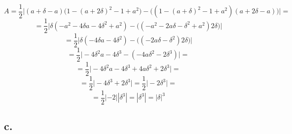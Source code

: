 \documentclass{article}
\begin{document}
\begin{equation*}
    A = \frac{1}{2}\Big|(a + \delta - a)\Big(1 - (a + 2\delta)^{2} - 1 + a^{2}\Big) - \Big((1 - (a + \delta)^{2} - 1 + a^{2})(a + 2\delta - a)\Big)\Big| =
\end{equation*}
\begin{equation*}
    = \frac{1}{2}\Big|\delta(-a^{2} - 4\delta a - 4\delta^{2} + a^{2}) - \Big((-a^{2} - 2a\delta - \delta^{2} + a^{2})2\delta\Big)\Big|
\end{equation*}
\begin{equation*}
    = \frac{1}{2}\Big|\delta(-4\delta a - 4\delta^{2}) - \Big((- 2a\delta - \delta^{2})2\delta\Big)\Big|
\end{equation*}
\begin{equation*}
    = \frac{1}{2}\Big|-4\delta^{2}a - 4\delta^{3} - (-4a\delta^{2} - 2\delta^{3})\Big| =
\end{equation*}
\begin{equation*}
    = \frac{1}{2}\Big|-4\delta^{2}a - 4\delta^{3} + 4a\delta^{2} + 2\delta^{3}\Big| = 
\end{equation*}
\begin{equation*}
    = \frac{1}{2}\Big| -4\delta^{3} + 2\delta^{3} \Big| = \frac{1}{2}\Big| -2\delta^{3} \Big| = 
\end{equation*}
\begin{equation*}
    = \frac{1}{2}|-2||\delta^{3}| = |\delta^{3}| = |\delta|^{3}
\end{equation*}


\subsection*{c.}
\end{document}
